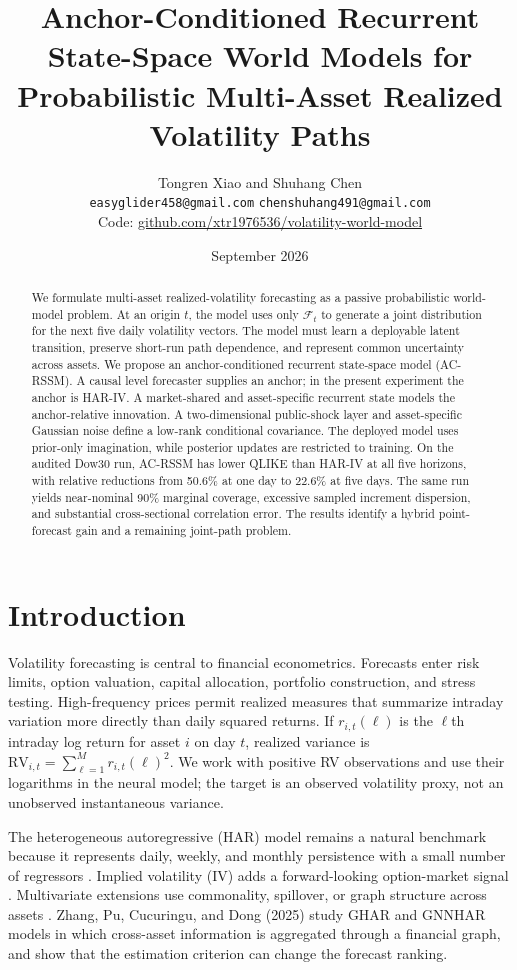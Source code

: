 \documentclass[11pt]{article}
\title{Anchor-Conditioned Recurrent State-Space World Models for\\Probabilistic Multi-Asset Realized Volatility Paths}
\author{Tongren Xiao \quad and \quad Shuhang Chen\\[3pt]
\small \texttt{easyglider458@gmail.com} \quad \texttt{chenshuhang491@gmail.com}\\[-1pt]
\small Code: \href{https://github.com/xtr1976536/volatility-world-model}{github.com/xtr1976536/volatility-world-model}}
\date{September 2026}
\newcommand{\RV}{\mathrm{RV}}\newcommand{\IV}{\mathrm{IV}}\newcommand{\cF}{\mathcal F}\newcommand{\R}{\mathbb R}
\begin{document}
\maketitle
\begin{abstract}
We formulate multi-asset realized-volatility forecasting as a passive probabilistic world-model problem. At an origin $t$, the model uses only $\cF_t$ to generate a joint distribution for the next five daily volatility vectors. The model must learn a deployable latent transition, preserve short-run path dependence, and represent common uncertainty across assets. We propose an anchor-conditioned recurrent state-space model (AC-RSSM). A causal level forecaster supplies an anchor; in the present experiment the anchor is HAR-IV. A market-shared and asset-specific recurrent state models the anchor-relative innovation. A two-dimensional public-shock layer and asset-specific Gaussian noise define a low-rank conditional covariance. The deployed model uses prior-only imagination, while posterior updates are restricted to training. On the audited Dow30 run, AC-RSSM has lower QLIKE than HAR-IV at all five horizons, with relative reductions from 50.6\% at one day to 22.6\% at five days. The same run yields near-nominal 90\% marginal coverage, excessive sampled increment dispersion, and substantial cross-sectional correlation error. The results identify a hybrid point-forecast gain and a remaining joint-path problem.
\end{abstract}

\section{Introduction}
Volatility forecasting is central to financial econometrics. Forecasts enter risk limits, option valuation, capital allocation, portfolio construction, and stress testing. High-frequency prices permit realized measures that summarize intraday variation more directly than daily squared returns. If $r_{i,t}(\ell)$ is the $\ell$th intraday log return for asset $i$ on day $t$, realized variance is $\RV_{i,t}=\sum_{\ell=1}^{M}r_{i,t}(\ell)^2$. We work with positive RV observations and use their logarithms in the neural model; the target is an observed volatility proxy, not an unobserved instantaneous variance.

The heterogeneous autoregressive (HAR) model remains a natural benchmark because it represents daily, weekly, and monthly persistence with a small number of regressors \cite{corsi2009}. Implied volatility (IV) adds a forward-looking option-market signal \cite{christensen1998}. Multivariate extensions use commonality, spillover, or graph structure across assets \cite{zhangcommon2024,zhang2025}. Zhang, Pu, Cucuringu, and Dong (2025) study GHAR and GNNHAR models in which cross-asset information is aggregated through a financial graph, and show that the estimation criterion can change the forecast ranking.
\end{document}
